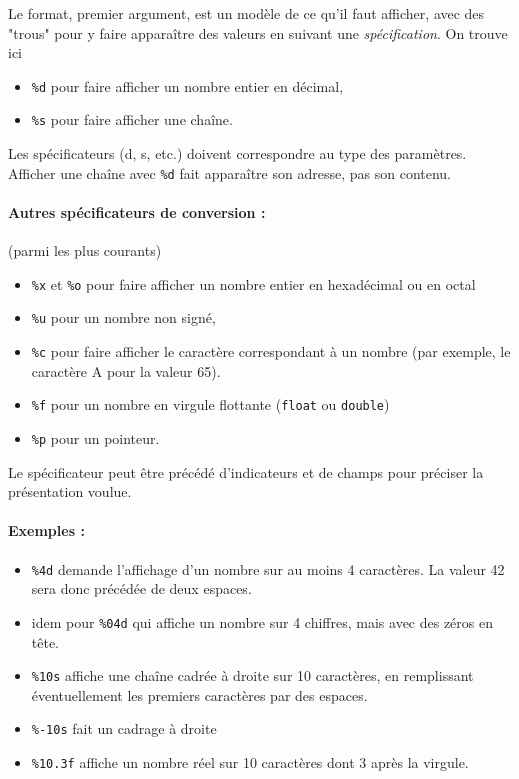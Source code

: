 \documentclass[10pt]{article}
\begin{document}
Le format, premier argument, est un modèle de ce qu'il faut afficher,
avec des "trous" pour y faire apparaître des valeurs en suivant une
\emph{spécification}. On trouve ici
\begin{itemize}
\item \texttt{\%d} pour faire afficher un nombre entier en décimal,
\item \texttt{\%s} pour faire afficher une chaîne.
\end{itemize}

Les spécificateurs (d, s, etc.) doivent correspondre au type des
paramètres. Afficher une chaîne avec \texttt{\%d} fait apparaître son
adresse, pas son contenu.


\paragraph{Autres spécificateurs de conversion :} (parmi les plus courants)
\begin{itemize}
\item \texttt{\%x} et \texttt{\%o}  pour faire afficher un nombre entier 
en hexadécimal ou en octal
\item \texttt{\%u} pour un nombre non signé,
\item \texttt{\%c} pour faire afficher le caractère correspondant à un nombre
(par exemple, le caractère A pour la valeur 65).
\item \texttt{\%f} pour un nombre en virgule flottante (\texttt{float}
 ou \texttt{double})
\item \texttt{\%p} pour un pointeur.
\end{itemize}

Le spécificateur peut être précédé d'indicateurs et de
champs pour préciser la présentation voulue.

\paragraph{Exemples : }
\begin{itemize}
\item \texttt{\%4d} demande l'affichage d'un nombre sur au moins 4 
caractères. La valeur 42 sera donc précédée de deux espaces.
\item idem pour \texttt{\%04d} qui affiche un nombre sur 4 chiffres, mais
avec des zéros en tête.
\item \texttt{\%10s} affiche une chaîne cadrée à droite sur 10 caractères, en 
remplissant éventuellement les premiers caractères par des espaces.
\item \texttt{\%-10s} fait un cadrage à droite
\item \texttt{\%10.3f} affiche un nombre réel sur 10 caractères dont 3
après la virgule.
\end{itemize}
\end{document}
